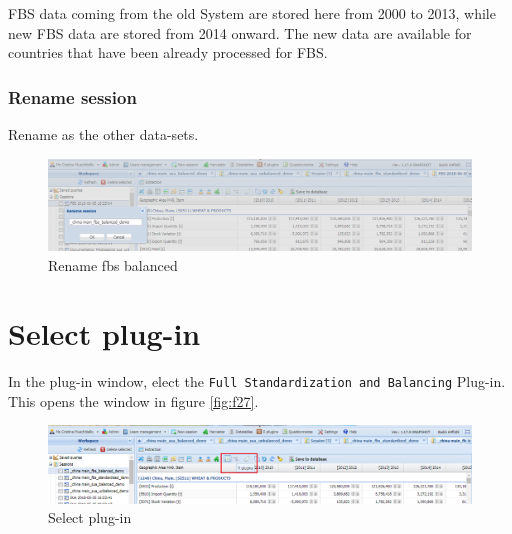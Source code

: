 \documentclass[]{article}
\begin{document}
FBS data coming from the old System are stored here from 2000 to 2013,
while new FBS data are stored from 2014 onward. The new data are
available for countries that have been already processed for FBS.

\subsubsection{Rename session}\label{rename-session-3}

Rename as the other data-sets.

\begin{figure}[H]

{\centering \includegraphics[width=1\linewidth]{images/standPlugin/23_renamefbsBal} 

}

\caption{\label{fig:f24}Rename fbs balanced}\label{fig:f24}
\end{figure}

\section{Select plug-in}\label{select-plug-in}

In the plug-in window, elect the
\texttt{Full\ Standardization\ and\ Balancing} Plug-in. This opens the
window in figure \ref{fig:f27}.

\begin{figure}[H]

{\centering \includegraphics[width=1\linewidth]{images/standPlugin/24_selectPlugin} 

}

\caption{\label{fig:f25}Select plug-in}\label{fig:f25}
\end{figure}
\end{document}
